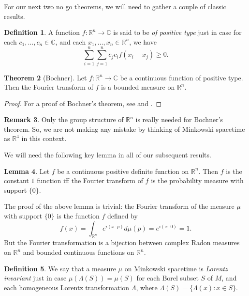 \documentclass[12pt]{article}
\theoremstyle{definition}
\newtheorem{thm}{Theorem}[section]
\newtheorem{lemma}[thm]{Lemma}
\theoremstyle{definition}
\newtheorem{defn}[thm]{Definition}
\newtheorem{note}[thm]{Remark}
\theoremstyle{remark}
\def\7#1{{\mathbb #1}}
\def\ol#1{{\overline #1}}
\begin{document}
For our next two no go theorems, we will need to gather a couple of classic results.


\begin{defn} A function $f:\7R ^n\to \7C$ is said to be \emph{of
    positive type} just in case for each $c_1,\dots ,c_n\in \7C$, and
  each $x_1,\dots ,x_n\in \7R ^n$, we have
$$ \sum _{i=1}^n \sum _{j=1}^n\ol c_j c_i f(x_i-x_j) \geq 0 .$$
\end{defn}

\begin{thm}[Bochner] Let $f:\7R ^n\to \7C$ be a continuous function of positive type.
  Then the Fourier transform of $f$ is a bounded measure on $\7R ^n$.
\end{thm}

\begin{proof} For a proof of Bochner's theorem, see \cite[p.\ 303]{rudin2} and
  \cite[p.\ 95]{folland}.
\end{proof}

\begin{note} Only the group structure of $\7R ^n$ is really needed for Bochner's
  theorem.  So, we are not making any mistake by thinking of Minkowski spacetime as
  $\7R ^4$ in this context.  \end{note}

We will need the following key lemma in all of our subsequent results.

\begin{lemma} Let $f$ be a continuous positive definite function on
  $\7R ^n$.  Then $f$ is the constant $1$ function iff the Fourier
  transform of $f$ is the probability measure with support $\{ 0\}$.
  \label{pmass}
\end{lemma}

The proof of the above lemma is trivial: the Fourier transform of the
measure $\mu$ with support $\{ 0\}$ is the function $f$ defined by
$$ f(x)=\int _{\7R ^n}e^{i(x\cdot p)} d\mu (p) = e^{i(x\cdot 0)}= 1 .$$
But the Fourier transformation is a bijection between complex Radon measures on $\7R
^n$ and bounded continuous functions on $\7R ^n$.


\begin{defn} We say that a measure $\mu$ on Minkowski spacetime is
  \emph{Lorentz invariant} just in case $\mu (\Lambda (S))=\mu (S)$
  for each Borel subset $S$ of $M$, and each homogeneous Lorentz
  transformation $\Lambda$, where $\Lambda (S)=\{ \Lambda (x):x\in
  S\}$.  \end{defn}
\end{document}
